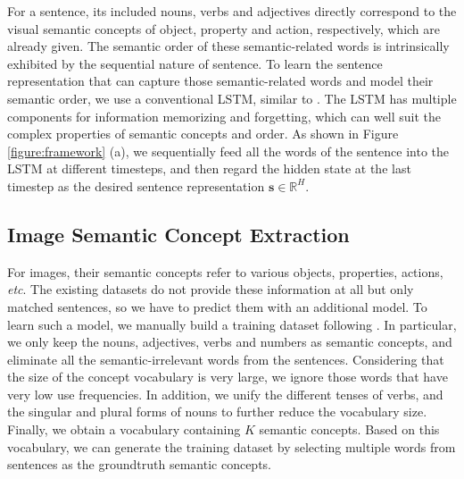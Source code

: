\documentclass[10pt,twocolumn,letterpaper]{article}
\begin{document}
For a sentence, its included nouns, verbs and adjectives
directly correspond to the visual semantic concepts of object, property and action, respectively,
which are already given.
The semantic order of these semantic-related words
is intrinsically exhibited by the sequential nature of sentence.
To learn the sentence representation that
can capture those semantic-related words
and model their semantic order,
we use a conventional LSTM, similar to \cite{kiros2014unifying,vendrov2015order}.
The LSTM has multiple components for information memorizing and forgetting,
which can well suit the complex properties of semantic concepts and order.
As shown in Figure \ref{figure:framework} (a),
we sequentially feed all the words of the sentence into the LSTM at different timesteps,
and then regard the hidden state at the last timestep as
the desired sentence representation $\textbf{s}\in {\mathbb{R}^{H}}$.






\subsection{Image Semantic Concept Extraction}

For images, their semantic concepts refer to various objects,
properties, actions, \emph{etc}.
The existing datasets do not provide these information at all
but only matched sentences,
so we have to predict them with an additional model.
To learn such a model, we manually build a training dataset
following \cite{fang2015captions,wu2016value}.
In particular, we only keep the nouns, adjectives, verbs and numbers as semantic concepts,
and eliminate all the semantic-irrelevant words from the sentences.
Considering that the size of the concept vocabulary is very large,
we ignore those words that have very low use frequencies.
In addition, we unify the different tenses of verbs,
and the singular and plural forms of nouns
to further reduce the vocabulary size.
Finally, we obtain a vocabulary containing $K$ semantic concepts.
Based on this vocabulary, we can generate the training dataset
by selecting multiple words from sentences as the groundtruth semantic concepts.
\end{document}
